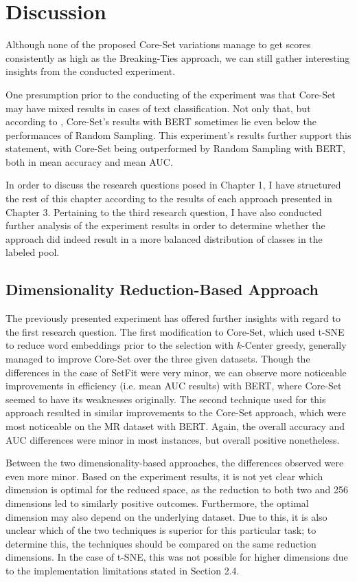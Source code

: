 \documentclass[english,bachelor,ul]{webisthesis} %
\begin{document}
\chapter{Discussion}

Although none of the proposed Core-Set variations manage to get scores consistently as high as the Breaking-Ties approach, we can still gather interesting insights from the conducted experiment. 

One presumption prior to the conducting of the experiment was that Core-Set may have mixed results in cases of text classification. Not only that, but according to \cite{DBLP:conf/kdd/0002MM21}, Core-Set's results with BERT sometimes lie even below the performances of Random Sampling. This experiment's results further support this statement, with Core-Set being outperformed by Random Sampling with BERT, both in mean accuracy and mean AUC.

In order to discuss the research questions posed in Chapter 1, I have structured the rest of this chapter according to the results of each approach presented in Chapter 3. Pertaining to the third research question, I have also conducted further analysis of the experiment results in order to determine whether the approach did indeed result in a more balanced distribution of classes in the labeled pool.

\section{Dimensionality Reduction-Based Approach}

The previously presented experiment has offered further insights with regard to the first research question. The first modification to Core-Set, which used t-SNE to reduce word embeddings prior to the selection with $k$-Center greedy, generally managed to improve Core-Set over the three given datasets. Though the differences in the case of SetFit were very minor, we can observe more noticeable improvements in efficiency (i.e. mean AUC results) with BERT, where Core-Set seemed to have its weaknesses originally. The second technique used for this approach resulted in similar improvements to the Core-Set approach, which were most noticeable on the MR dataset with BERT. Again, the overall accuracy and AUC differences were minor in most instances, but overall positive nonetheless.

Between the two dimensionality-based approaches, the differences observed were even more minor. Based on the experiment results, it is not yet clear which dimension is optimal for the reduced space, as the reduction to both two and 256 dimensions led to similarly positive outcomes. Furthermore, the optimal dimension may also depend on the underlying dataset. Due to this, it is also unclear which of the two techniques is superior for this particular task; to determine this, the techniques should be compared on the same reduction dimensions. In the case of t-SNE, this was not possible for higher dimensions due to the implementation limitations stated in Section 2.4. 
\end{document}
